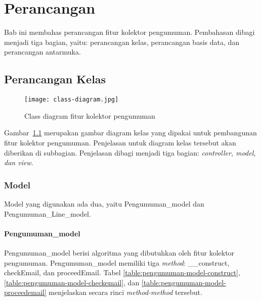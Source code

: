 \chapter{Perancangan}
\label{chap:perancangan}

Bab ini membahas perancangan fitur kolektor pengumuman. Pembahasan dibagi menjadi tiga bagian, yaitu: perancangan kelas, perancangan basis data, dan perancangan antarmuka.
 
\section{Perancangan Kelas}
\begin{figure}[H]
	\centering  
	\texttt{[image: class-diagram.jpg]}  
	\caption[Class diagram fitur kolektor pengumuman]{Class diagram fitur kolektor pengumuman} 
	\label{fig:class-diagram} 
\end{figure}
Gambar~\ref{fig:class-diagram} merupakan gambar diagram kelas yang dipakai untuk pembangunan fitur kolektor pengumuman. Penjelasan untuk diagram kelas tersebut akan diberikan di subbagian. Penjelasan dibagi menjadi tiga bagian: \textit{controller, model, dan view}.

\subsection{Model}
Model yang digunakan ada dua, yaitu Pengumuman\_model dan Pengumuman\_Line\_model.
\subsubsection{Pengumuman\_model}
Pengumuman\_model berisi algoritma yang dibutuhkan oleh fitur kolektor pengumuman. Pengumuman\_model memiliki tiga \textit{method}: \_\_construct, checkEmail, dan proceedEmail. Tabel \ref{table:pengumuman-model-construct}, \ref{table:pengumuman-model-checkemail}, dan \ref{table:pengumuman-model-proceedemail} menjelaskan secara rinci \textit{method-method} tersebut.

